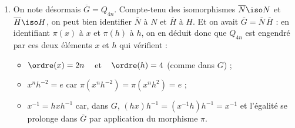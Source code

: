 \begin{enumerate}[resume]
    \item On note désormais $\overline{G} = Q_{4n}$. Compte-tenu des isomorphismes $\overline{N} \iso N$ et  $\overline{H} \iso H$, on peut bien identifier $\overline{N}$ à $N$ et $\overline{H}$ à $H$.
    Et on avait $\overline{G} = \overline{N}\, \overline{H} $ : en identifiant $\pi(x)$ à $x$ et $\pi(h)$ à $h$, on en déduit donc que $Q_{4n}$ est engendré par ces deux éléments $x$ et $h$ qui vérifient :
    \begin{itemize}
        \item $\ordre(x) = 2n$ ~ et ~ $\ordre(h) = 4$ (comme dans $G$) ;
        \item $x^nh^{-2} = e$ car $\pi(x^nh^{-2}) = \pi(x^nh^2) = e$ ;
        \item $x^{-1} = hxh^{-1}$ car, dans $G$, $(h x)h^{-1} = (x^{-1}h)h^{-1}= x^{-1}$ et l'égalité se prolonge dans $\overline{G}$ par application du morphisme $\pi$.
    \end{itemize}


\end{enumerate}

